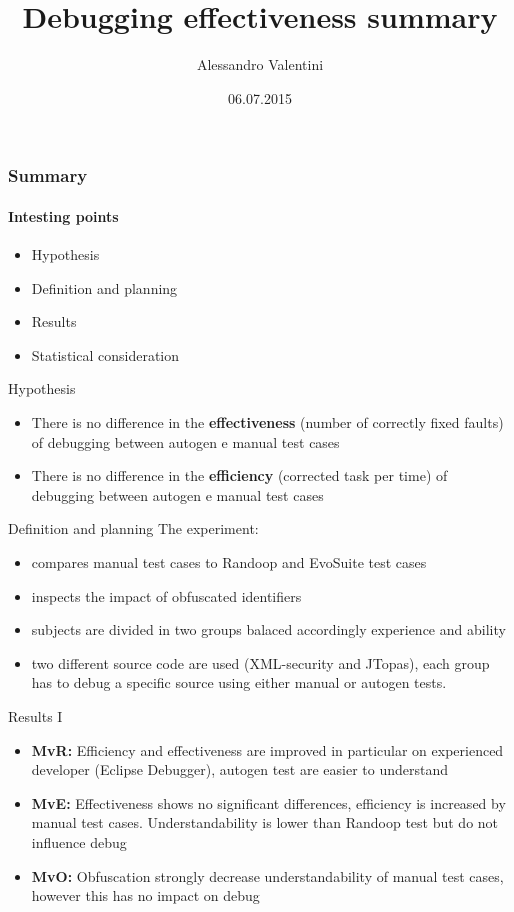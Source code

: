 \documentclass{beamer}
\title{Debugging effectiveness summary}
\author{Alessandro Valentini}
\date{06.07.2015}
\newcommand{\itembf}[1]{\item \textbf{#1}}
\begin{document}
\begin{frame}
\maketitle
\end{frame}

\begin{frame}
	\frametitle{Summary}
	\framesubtitle{Intesting points}
	\begin{itemize}
	\item Hypothesis
	\item Definition and planning
	\item Results
	\item Statistical consideration
	\end{itemize}
\end{frame}

\begin{frame}{Hypothesis}
\begin{itemize}
	\item There is no difference in the \textbf{effectiveness} (number of correctly fixed faults) of debugging between autogen e manual test cases
	\item There is no difference in the \textbf{efficiency} (corrected task per time) of debugging between autogen e manual test cases
	\end{itemize}
\end{frame}

\begin{frame}{Definition and planning}
The experiment:
	\begin{itemize} 
		\item compares manual test cases to Randoop and EvoSuite test cases
		\item inspects the impact of obfuscated identifiers
		\item subjects are divided in two groups balaced accordingly experience and ability
		\item two different source code are used (XML-security and JTopas), each group has to debug a specific source using either manual or autogen tests.
	\end{itemize}
\end{frame}

\begin{frame}{Results I}
	\begin{itemize} 
		\itembf{MvR:} Efficiency and effectiveness are improved in particular on experienced developer (Eclipse Debugger), autogen test are easier to understand
		\itembf{MvE:} Effectiveness shows no significant differences, efficiency is increased by manual test cases. Understandability is lower than Randoop test but do not influence debug
		\itembf{MvO:} Obfuscation strongly decrease understandability of manual test cases, however this has no impact on debug
	\end{itemize}
\end{frame}
\end{document}

